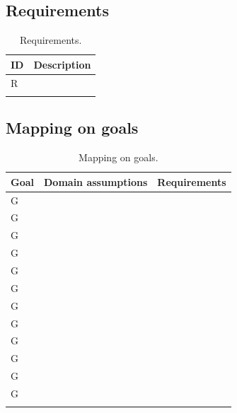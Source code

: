 \subsection{Requirements}
\label{subsec: requirements}%
\setcounter{req}{1}
\newcommand{\creq}{\thereq\stepcounter{req}}
\begin{center}
    \begin{longtable}{|l|l|}
        \hline
        \textbf{ID} & \textbf{Description} \\
        \hline
        R\creq      &                      \\
        \hline
        \caption{Requirements.}
        \label{tab: req}%
    \end{longtable}
\end{center}

\subsection{Mapping on goals}
\label{subsec: map_on_g}%
\setcounter{mg}{1}
\newcommand{\cmg}{\themg\stepcounter{mg}}
\begin{center}
    \begin{longtable}{|l|l|l|}
        \hline
        \textbf{Goal} & \textbf{Domain assumptions} & \textbf{Requirements} \\
        \hline
        G\cmg         &                             &                       \\
        \hline
        G\cmg         &                             &                       \\
        \hline
        G\cmg         &                             &                       \\
        \hline
        G\cmg         &                             &                       \\
        \hline
        G\cmg         &                             &                       \\
        \hline
        G\cmg         &                             &                       \\
        \hline
        G\cmg         &                             &                       \\
        \hline
        G\cmg         &                             &                       \\
        \hline
        G\cmg         &                             &                       \\
        \hline
        G\cmg         &                             &                       \\
        \hline
        G\cmg         &                             &                       \\
        \hline
        G\cmg         &                             &                       \\
        \hline
        \caption{Mapping on goals.}
        \label{tab: map_on_g}%
    \end{longtable}
\end{center}

